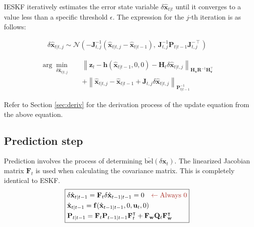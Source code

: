 \documentclass[10pt]{article}
\begin{document}
IESKF iteratively estimates the error state variable $\delta \hat{\mathbf{x}}_{t|t}$ until it converges to a value less than a specific threshold $\epsilon$. The expression for the $j$-th iteration is as follows:

\begin{equation}  
	\boxed{ \begin{aligned} 
			\delta \hat{\mathbf{x}}_{t|t,j} \sim \mathcal{N}(-\mathbf{J}_{t,j}^{-1}(\hat{\mathbf{x}}_{t|t,j} - \hat{\mathbf{x}}_{t|t-1}), \ \mathbf{J}_{t,j}^{-1}\mathbf{P}_{t|t-1}\mathbf{J}_{t,j}^{-\intercal})
	\end{aligned} }
\end{equation}

\begin{equation}  \label{eq:ieskf6}
	\boxed{ \begin{aligned} 
			\arg\min_{\delta \hat{\mathbf{x}}_{t|t,j}} \quad & \left\| \mathbf{z}_{t} - \mathbf{h}(\hat{\mathbf{x}}_{t|t-1}, 0, 0) - \mathbf{H}_{t} \delta\hat{\mathbf{x}}_{t|t,j} \right\|_{\mathbf{H}_{\mathbf{v}}\mathbf{R}^{-1}\mathbf{H}_{\mathbf{v}}^{\intercal}} \\ 
			& + \left\| \hat{\mathbf{x}}_{t|t,j} - \hat{\mathbf{x}}_{t|t-1} + \mathbf{J}_{t,j}\delta\hat{\mathbf{x}}_{t|t,j} \right\|_{\mathbf{P}_{t|t-1}^{-1}} 
	\end{aligned} }
\end{equation}

Refer to Section \ref{sec:deriv} for the derivation process of the update equation from the above equation.


\subsection{Prediction step}
Prediction involves the process of determining $\overline{\text{bel}}(\delta \mathbf{x}_{t})$. The linearized Jacobian matrix $\mathbf{F}_{t}$ is used when calculating the covariance matrix. This is completely identical to ESKF.
\begin{equation} 
	\boxed{  \begin{aligned}
			& \delta \hat{\mathbf{x}}_{t|t-1} = \mathbf{F}_{t}\delta \hat{\mathbf{x}}_{t-1|t-1} = 0 {\color{Mahogany} \quad \leftarrow \text{Always 0} } \\
			& \hat{\mathbf{x}}_{t|t-1} = \mathbf{f}(\hat{\mathbf{x}}_{t-1|t-1}, 0,\mathbf{u}_{t}, 0) \\ 
			& \mathbf{P}_{t|t-1} = \mathbf{F}_{t}\mathbf{P}_{t-1|t-1}\mathbf{F}_{t}^{\intercal} + \mathbf{F}_{\mathbf{w}}\mathbf{Q}_{t}  \mathbf{F}_{\mathbf{w}}^{\intercal}
	\end{aligned} }
\end{equation}
\end{document}
